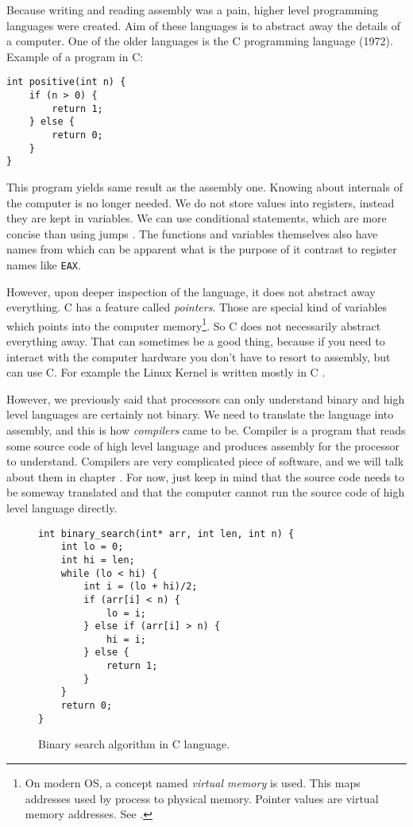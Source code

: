 Because writing and reading assembly was a pain, higher level programming languages were created.
Aim of these languages is to abstract away the details of a computer. One of the older languages is the C programming language (1972).
Example of a program in C:
\begin{verbatim}
int positive(int n) {
    if (n > 0) {
        return 1;
    } else {
        return 0;
    }
}
\end{verbatim}
This program yields same result as the assembly one. Knowing about internals of the computer is no longer needed.
We do not store values into registers, instead they are kept in variables. We can use conditional statements,
which are more concise than using jumps .
The functions and variables themselves also have names from which
can be apparent what is the purpose of it contrast to register names like \texttt{EAX}.

However, upon deeper inspection of the language, it does not abstract away everything. C has a feature called
\textit{pointers}. Those are special kind of variables which points into the computer memory\footnote{On modern OS,
a concept named \textit{virtual memory} is used. This maps addresses used by process to physical memory. Pointer values are virtual memory addresses. See \cite{modern-os}.}.
So C does not necessarily abstract everything away. That can sometimes be a good thing, because if you need to 
interact with the computer hardware you don't have to resort to assembly, but can use C. For example the Linux
 Kernel is written mostly in C \cite{linux-source}.

However, we previously said that processors can only understand binary and high level languages are certainly not binary.
We need to translate the language into assembly, and this is how \textit{compilers} came to be. Compiler is a program
that reads some source code of high level language and produces assembly for the processor to understand. Compilers
are very complicated piece of software, and we will talk about them in chapter .
For now, just keep in mind that the source code needs to be someway translated and that the computer cannot
run the source code of high level language directly.

\begin{figure}[H]\label{fig:binary-search}
    \begin{verbatim}
int binary_search(int* arr, int len, int n) {
    int lo = 0;
    int hi = len;
    while (lo < hi) {
        int i = (lo + hi)/2;
        if (arr[i] < n) {
            lo = i;
        } else if (arr[i] > n) {
            hi = i;
        } else {
            return 1;
        }
    }
    return 0;
}
    \end{verbatim}
    \caption{Binary search algorithm in C language.}
\end{figure}

